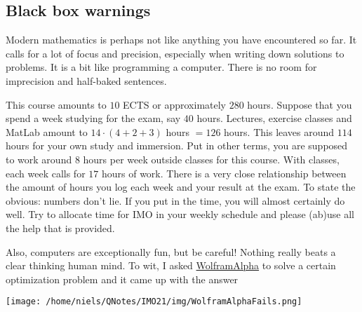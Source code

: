 \begin{tcolorbox}
  \section{Black box warnings}

  Modern mathematics is perhaps not like
  anything you have encountered so far. It calls for a lot of focus and precision, especially when
  writing down solutions to problems. It is a bit like programming a computer. There is no room for imprecision and half-baked sentences.

  This course amounts to $10$ ECTS or approximately $280$ hours. Suppose that you spend
  a week studying for the exam, say $40$ hours. Lectures, exercise classes and MatLab amount to $14\cdot (4 + 2 + 3)$ hours $= 126$ hours. This leaves around $114$ hours for your own study and immersion. Put in
  other terms, you are supposed to work around $8$ hours per week outside classes for this course. With
  classes, each week calls for $17$ hours of work. There is a very close relationship between the amount
  of hours you log each week and your result at the exam. To state the obvious: numbers don't lie. If you
  put in the time, you will almost certainly do well. Try to allocate time for IMO in your weekly
  schedule and please (ab)use all the help that is provided.




  Also, computers are exceptionally fun, but be careful! Nothing
  really beats a clear thinking human mind. To wit, I asked \href{https://wolframalpha.com}{WolframAlpha} to solve a
  certain optimization problem and it came up with the answer

  \begin{center}\texttt{[image: /home/niels/QNotes/IMO21/img/WolframAlphaFails.png]}\end{center}


\end{tcolorbox}

